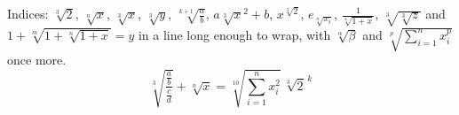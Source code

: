 \documentclass[11pt]{article}
\begin{document}
Indices: $\sqrt[3]{2}$, $\sqrt[n]{x}$, $\sqrt[3]x$, $\sqrt[{3}]{y}$, $\sqrt[k+1]{\frac{a}{b}}$, $a\sqrt[3]{x}^2+b$,
$x^{\sqrt[3]{2}}$, $e_{\sqrt[n]{x_i}}$, $\frac{1}{\sqrt[4]{1+x}}$, $\sqrt[3]{\sqrt[3]{z}}$ and $1+\sqrt[m]{1+\sqrt[n]{1+x}}=y$
in a line long enough to wrap, with $\sqrt[\alpha]{\beta}$ and $\sqrt[p]{\sum_{i=1}^n x_i^p}$ once more.
\[ \sqrt[3]{\frac{\frac{a}{b}}{\frac{c}{d}}} + \sqrt[n]{x} = \sqrt[10]{\sum_{i=1}^n x_i^2}\,\sqrt[3]{2}^{\,k} \]
\end{document}
